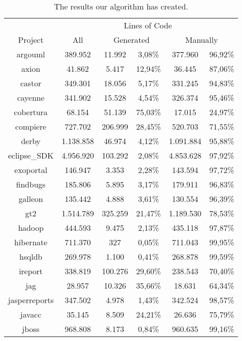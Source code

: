 \setlength{\extrarowheight}{-.15em}
\begin{table}
	\caption{The results our algorithm has created.}
	\label{table:locQualitasCorpus}
	\begin{tabularx}{\textwidth}{c|c|c|c|c|c}
		& \multicolumn{5}{c}{Lines of Code}  \\
		Project & All & \multicolumn{2}{c|}{Generated} & \multicolumn{2}{c}{Manually}  \\
		\hline
		argouml & 389.952 & 11.992 & 3,08\% & 377.960 & 96,92\% \\
		axion & 41.862 & 5.417 & 12,94\% & 36.445 & 87,06\% \\
		castor & 349.301 & 18.056 & 5,17\% & 331.245 & 94,83\% \\
		cayenne & 341.902 & 15.528 & 4,54\% & 326.374 & 95,46\% \\
		cobertura & 68.154 & 51.139 & 75,03\% & 17.015 & 24,97\% \\
		compiere & 727.702 & 206.999 & 28,45\% & 520.703 & 71,55\% \\
		derby & 1.138.858 & 46.974 & 4,12\% & 1.091.884 & 95,88\% \\
		eclipse\_SDK & 4.956.920 & 103.292 & 2,08\% & 4.853.628 & 97,92\% \\
		exoportal & 146.947 & 3.353 & 2,28\% & 143.594 & 97,72\% \\
		findbugs & 185.806 & 5.895 & 3,17\% & 179.911 & 96,83\% \\
		galleon & 135.442 & 4.888 & 3,61\% & 130.554 & 96,39\% \\
		gt2 & 1.514.789 & 325.259 & 21,47\% & 1.189.530 & 78,53\% \\
		hadoop & 444.593 & 9.475 & 2,13\% & 435.118 & 97,87\% \\
		hibernate & 711.370 & 327 & 0,05\% & 711.043 & 99,95\% \\
		hsqldb & 269.978 & 1.100 & 0,41\% & 268.878 & 99,59\% \\
		ireport & 338.819 & 100.276 & 29,60\% & 238.543 & 70,40\% \\
		jag & 28.957 & 10.326 & 35,66\% & 18.631 & 64,34\% \\
		jasperreports & 347.502 & 4.978 & 1,43\% & 342.524 & 98,57\% \\
		javacc & 35.145 & 8.509 & 24,21\% & 26.636 & 75,79\% \\
		jboss & 968.808 & 8.173 & 0,84\% & 960.635 & 99,16\% \\

\end{tabularx}
\end{table}
